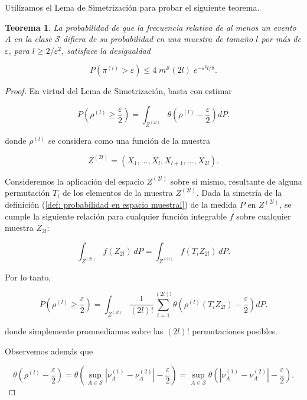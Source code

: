 \documentclass{report}
\newtheorem{thm}{Teorema}[subsection]
\begin{document}
Utilizamos el Lema de Simetrización para probar el siguiente teorema.\newline

\begin{thm}
    La probabilidad de que la frecuencia relativa de al menos un evento $A$ en la clase \( \mathcal{S} \) difiera de su probabilidad en una 
    muestra de tamaño \( l \) por más de \( \varepsilon \), para \( l \geq 2 / \varepsilon^2 \), satisface la desigualdad  

    \[
    P\left(\pi^{(l)} > \varepsilon\right) \leq 4 \; m^{\mathcal{S}}(2l) \; e^{-\varepsilon^2 l/8}.
    \]  
\end{thm}

\begin{proof}
 
En virtud del Lema de Simetrización, basta con estimar  
    
\[
P\left( \rho^{(l)} \geq \frac{\varepsilon}{2} \right) = \int_{Z^{(2l)}} \theta \left( \rho^{(l)} - \frac{\varepsilon}{2} \right) dP.
\]

donde \( \rho^{(l)} \) se considera como una función de la muestra  

\[
Z^{(2l)} = (X_1, \dots, X_l, X_{l+1}, \dots, X_{2l}).
\]

Consideremos la aplicación del espacio \( Z^{(2l)} \) sobre sí mismo, resultante de alguna permutación \( T_i \) de los elementos de la muestra \( Z^{(2l)} \). Dada la simetría 
de la definición (\ref{def: probabilidad en espacio muestral}) de la medida \( P \) en \( Z^{(2l)} \), se cumple la siguiente relación para cualquier función integrable \( f \)
sobre cualquier muestra $Z_{2l}$:

\[
\int_{Z^{(2l)}} f(Z_{2l}) \, dP = \int_{Z^{(2l)}} f(T_i Z_{2l}) \, dP.
\]

Por lo tanto,

\begin{equation}\label{eq:probabilidad integral con permutaciones}
P\left( \rho^{(l)} \geq \frac{\varepsilon}{2} \right) = \int_{Z^{(2l)}} \frac{1}{(2l)!} \sum_{i=1}^{(2l)!} \theta \left( \rho^{(l)}(T_i Z_{2l}) - \frac{\varepsilon}{2}  \right) dP.
\end{equation}

donde simplemente promnediamos sobre las \((2l)!\) permutaciones posibles.\newline

Observemos además que

\[
\theta \left( \rho^{(l)} - \frac{\varepsilon}{2} \right) = \theta \left( \sup_{A \in \mathcal{S}} \left| \nu^{(1)}_A - \nu^{(2)}_A \right| -
 \frac{\varepsilon}{2} \right) = \sup_{A \in \mathcal{S}} \theta \left( \left| \nu^{(1)}_A - \nu^{(2)}_A \right| - \frac{\varepsilon}{2} \right).
\]


\end{proof}
\end{document}
